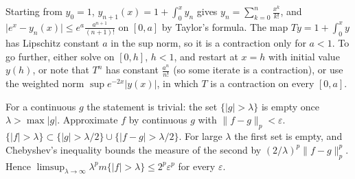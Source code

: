 \documentclass[11pt,a4paper]{article}
\begin{document}
Starting from \(y_0=1\), \(y_{n+1}(x)=1+\int_0^xy_n\) gives \(y_n=\sum_{k=0}^n\frac{x^k}{k!}\), and \(\lvert e^x-y_n(x)\rvert\le e^a\frac{a^{n+1}}{(n+1)!}\) on \([0,a]\) by Taylor's formula.
The map \(Ty=1+\int_0^xy\) has Lipschitz constant \(a\) in the sup norm, so it is a contraction only for \(a\lt1\). To go further, either solve on \([0,h]\), \(h\lt1\), and restart at \(x=h\) with initial value \(y(h)\), or note that \(T^n\) has constant \(\frac{a^n}{n!}\) (so some iterate is a contraction), or use the weighted norm \(\sup e^{-2x}\lvert y(x)\rvert\), in which \(T\) is a contraction on every \([0,a]\).

For a continuous \(g\) the statement is trivial: the set \(\{\lvert g\rvert\gt\lambda\}\) is empty once \(\lambda\gt\max\lvert g\rvert\). Approximate \(f\) by continuous \(g\) with \(\lVert f-g\rVert_p\lt\varepsilon\).
\(\{\lvert f\rvert\gt\lambda\}\subset\{\lvert g\rvert\gt\lambda/2\}\cup\{\lvert f-g\rvert\gt\lambda/2\}\). For large \(\lambda\) the first set is empty, and Chebyshev's inequality bounds the measure of the second by \((2/\lambda)^p\lVert f-g\rVert_p^p\). Hence \(\limsup_{\lambda\to\infty}\lambda^pm\{\lvert f\rvert\gt\lambda\}\le2^p\varepsilon^p\) for every \(\varepsilon\).
\end{document}
